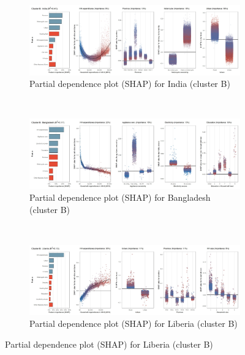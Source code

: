\begin{figure}[ht!]\ContinuedFloat
    \centering
   \begin{subfigure}[b]{\textwidth}
         \centering
         \caption{Partial dependence plot (SHAP) for India (cluster B)}
         \label{fig:5b_IND}
         \includegraphics[width=\textwidth]{Figure 5b/Figure_5b_IND}         
     \end{subfigure}
    \\
    \vspace{0.5cm}
   \begin{subfigure}[b]{\textwidth}
         \centering
         \caption{Partial dependence plot (SHAP) for Bangladesh (cluster B)}
         \label{fig:5b_BGD}
         \includegraphics[width=\textwidth]{Figure 5b/Figure_5b_BGD}         
     \end{subfigure}
    \\
    \vspace{0.5cm}
   \begin{subfigure}[b]{\textwidth}
         \centering
         \caption{Partial dependence plot (SHAP) for Liberia (cluster B)}
         \label{fig:5b_LBR}
         \includegraphics[width=\textwidth]{Figure 5b/Figure_5b_LBR}

\end{subfigure}
\end{figure}
